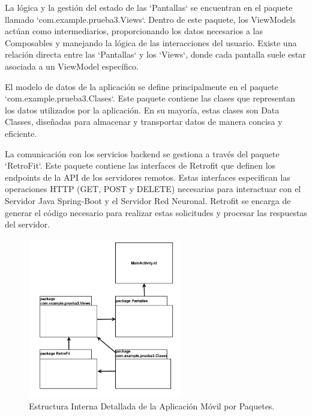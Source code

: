 La lógica y la gestión del estado de las `Pantallas` se encuentran en el paquete llamado `com.example.prueba3.Views`. Dentro de este paquete, los ViewModels actúan como intermediarios, proporcionando los datos necesarios a las Composables y manejando la lógica de las interacciones del usuario. Existe una relación directa entre las `Pantallas` y los `Views`, donde cada pantalla suele estar asociada a un ViewModel específico. 

El modelo de datos de la aplicación se define principalmente en el paquete `com.example.prueba3.Clases`. Este paquete contiene las clases que representan los datos utilizados por la aplicación. En su mayoría, estas clases son Data Classes, diseñadas para almacenar y transportar datos de manera concisa y eficiente.

La comunicación con los servicios backend se gestiona a través del paquete `RetroFit`. Este paquete contiene las interfaces de Retrofit que definen los endpoints de la API de los servidores remotos. Estas interfaces especifican las operaciones HTTP (GET, POST y DELETE) necesarias para interactuar con el Servidor Java Spring-Boot y el Servidor Red Neuronal. Retrofit se encarga de generar el código necesario para realizar estas solicitudes y procesar las respuestas del servidor.

\newpage

\begin{figure}[htbp!]
	\begin{center}
		\includegraphics[width=0.6\textwidth]{DiagramasMoviles/DCM (1)}
		\caption{Estructura Interna Detallada de la Aplicación Móvil por Paquetes.}
		\label{fig:Diagrama_app_movil_detallado}
	\end{center}
\end{figure}



